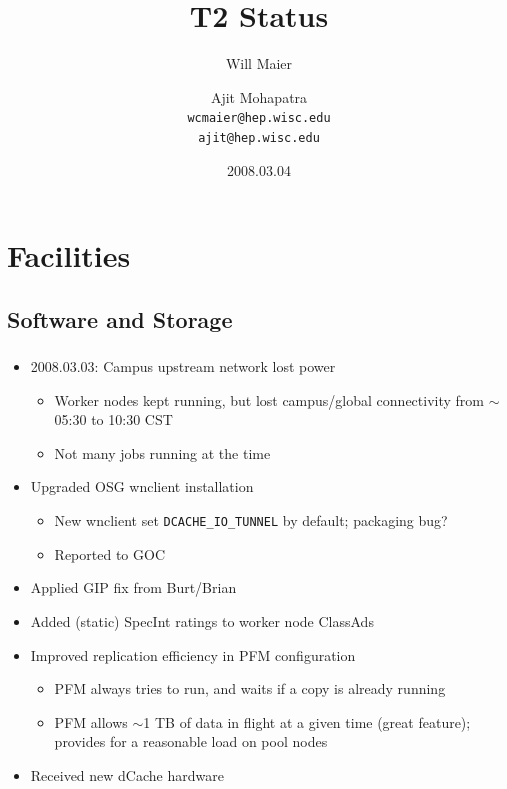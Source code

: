 \documentclass{beamer}
\title{T2 Status}
\author[Maier, Mohapatra]{
    Will Maier \and Ajit Mohapatra\\ 
    {\tt wcmaier@hep.wisc.edu}\\
    {\tt ajit@hep.wisc.edu}}
\institute[Wisconsin]{University of Wisconsin - High Energy Physics}
\date{2008.03.04}
\newcommand{\ca}{\ensuremath{\sim}}
\begin{document}
\begin{frame}
    \titlepage
\end{frame}


\section{Facilities}
\subsection{Software and Storage}
\begin{frame}
\frametitle{}
\begin{itemize}
    \item 2008.03.03: Campus upstream network lost power
    \begin{itemize}
        \item Worker nodes kept running, but lost campus/global connectivity from \ca{} 05:30 to 10:30 CST
        \item Not many jobs running at the time
    \end{itemize}
    \item Upgraded OSG wnclient installation
    \begin{itemize}
        \item New wnclient set {\tt DCACHE\_IO\_TUNNEL} by default; packaging bug?
        \item Reported to GOC
    \end{itemize}
    \item Applied GIP fix from Burt/Brian
    \item Added (static) SpecInt ratings to worker node ClassAds
    \item Improved replication efficiency in PFM configuration 
    \begin{itemize}
        \item PFM always tries to run, and waits if a copy is already running
        \item PFM allows \ca{}1 TB of data in flight at a given time (great feature); provides for a reasonable load on pool nodes
    \end{itemize}
    \item Received new dCache hardware
\end{itemize}
\end{frame}
\end{document}
